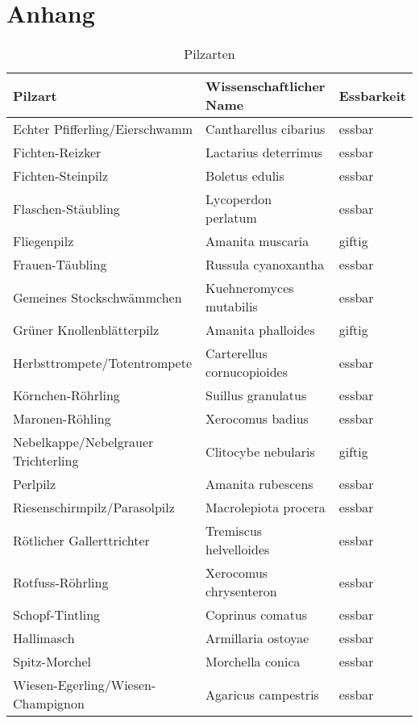\section{Anhang}

\begin{table}[h]
	\begin{center}
		\def\arraystretch{1.4}
		\begin{tabular}{l | l | l}
			\textbf{Pilzart} & \textbf{Wissenschaftlicher Name} & \textbf{Essbarkeit}\\
			\hline
			Echter Pfifferling/Eierschwamm & Cantharellus cibarius & essbar\\
			Fichten-Reizker & Lactarius deterrimus & essbar\\
			Fichten-Steinpilz & Boletus edulis & essbar\\
			Flaschen-Stäubling & Lycoperdon perlatum & essbar\\
			Fliegenpilz & Amanita muscaria & giftig\\
			Frauen-Täubling & Russula cyanoxantha & essbar\\
			Gemeines Stockschwämmchen & Kuehneromyces mutabilis & essbar\\
			Grüner Knollenblätterpilz & Amanita phalloides & giftig\\
			Herbsttrompete/Totentrompete & Carterellus cornucopioides & essbar\\
			Körnchen-Röhrling & Suillus granulatus & essbar\\
			Maronen-Röhling & Xerocomus badius & essbar\\
			Nebelkappe/Nebelgrauer Trichterling & Clitocybe nebularis & giftig\\
			Perlpilz & Amanita rubescens & essbar\\
			Riesenschirmpilz/Parasolpilz & Macrolepiota procera & essbar\\
			Rötlicher Gallerttrichter & Tremiscus helvelloides & essbar\\
			Rotfuss-Röhrling & Xerocomus chrysenteron & essbar\\
			Schopf-Tintling & Coprinus comatus & essbar\\
			Hallimasch & Armillaria ostoyae & essbar\\
			Spitz-Morchel & Morchella conica & essbar\\
			Wiesen-Egerling/Wiesen-Champignon & Agaricus campestris & essbar\\
		\end{tabular}
	\end{center}
	\caption{Pilzarten}
	\label{table:shrooms}
\end{table}

